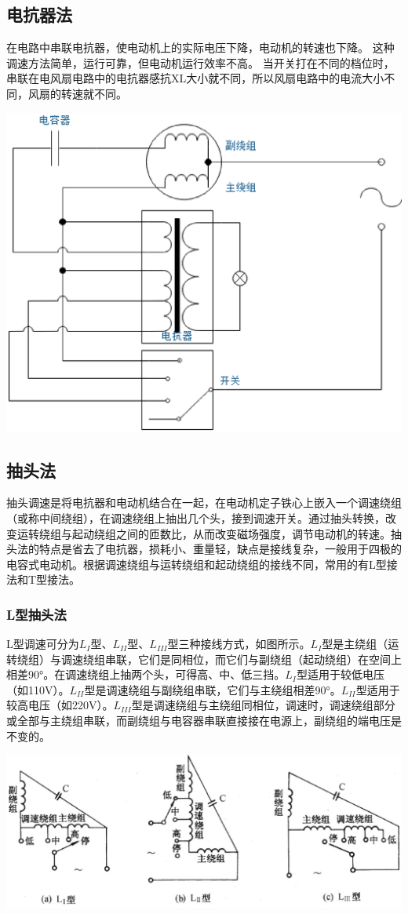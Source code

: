 \documentclass[a4paper,11pt]{ctexart}
\begin{document}
\subsection{电抗器法}
在电路中串联电抗器，使电动机上的实际电压下降，电动机的转速也下降。 这种调速方法简单，运行可靠，但电动机运行效率不高。
当开关打在不同的档位时，串联在电风扇电路中的电抗器感抗XL大小就不同，所以风扇电路中的电流大小不同，风扇的转速就不同。
\begin{center}
\includegraphics[width=0.7\linewidth]{./images/pic_2.eps}
\end{center}

\subsection{抽头法}
抽头调速是将电抗器和电动机结合在一起，在电动机定子铁心上嵌入一个调速绕组（或称中间绕组），在调速绕组上抽出几个头，接到调速开关。通过抽头转换，改变运转绕组与起动绕组之间的匝数比，从而改变磁场强度，调节电动机的转速。抽头法的特点是省去了电抗器，损耗小、重量轻，缺点是接线复杂，一般用于四极的电容式电动机。根据调速绕组与运转绕组和起动绕组的接线不同，常用的有L型接法和T型接法。
\subsubsection{L型抽头法}
L型调速可分为$L_I$型、$L_{II}$型、$L_{III}$型三种接线方式，如图所示。$L_I$型是主绕组（运转绕组）与调速绕组串联，它们是同相位，而它们与副绕组（起动绕组）在空间上相差90°。在调速绕组上抽两个头，可得高、中、低三挡。$L_I$型适用于较低电压（如110V）。$L_{II}$型是调速绕组与副绕组串联，它们与主绕组相差90°。$L_{II}$型适用于较高电压（如220V）。$L_{III}$型是调速绕组与主绕组同相位，调速时，调速绕组部分或全部与主绕组串联，而副绕组与电容器串联直接接在电源上，副绕组的端电压是不变的。
\begin{center}
\includegraphics[width=0.8\linewidth]{./images/pic_3.eps}
\end{center}
\end{document}
